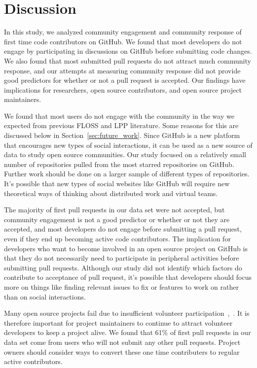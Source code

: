 \documentclass{sigchi}
\begin{document}
\section{Discussion} \label{chap:conclusion}

In this study, we analyzed community engagement and community response of first
time code contributors on GitHub. We found that most developers do not engage by
participating in discussions on GitHub before submitting code changes. We also
found that most submitted pull requests do not attract much community response,
and our attempts at measuring community response did not provide good predictors
for whether or not a pull request is accepted. Our findings have implications
for researchers, open source contributors, and open source project maintainers.

We found that most users do not engage with the community in the way we expected
from previous FLOSS and LPP literature. Some reasons for this are discussed
below in Section~\ref{sec:future_work}. Since GitHub is a new platform that
encourages new types of social interactions, it can be used as a new source of
data to study open source communities. Our study focused on a relatively small
number of repositories pulled from the most starred repositories on GitHub.
Further work should be done on a larger sample of different types of
repositories. It's possible that new types of social websites like GitHub will
require new theoretical ways of thinking about distributed work and virtual
teams.

The majority of first pull requests in our data set were not accepted, but
community engagement is not a good predictor or whether or not they are
accepted, and most developers do not engage before submitting a pull request,
even if they end up becoming active code contributors. The implication for
developers who want to become involved in an open source project on GitHub is
that they do not necessarily need to participate in peripheral activities before
submitting pull requests. Although our study did not identify which factors do
contribute to acceptance of pull request, it's possible that developers should
focus more on things like finding relevant issues to fix or features to work on
rather than on social interactions.

Many open source projects fail due to insufficient volunteer
participation~\cite{crowston_defining_2003},~\cite{krishnamurthy_cave_2002}. It
is therefore important for project maintainers to continue to attract volunteer
developers to keep a project alive. We found that 61\% of first pull requests in
our data set come from users who will not submit any other pull requests.
Project owners should consider ways to convert these one time contributers to
regular active contributors.
\end{document}

